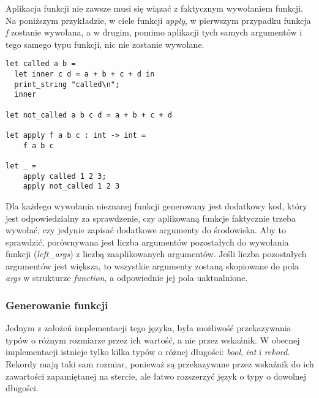 \documentclass[declaration,shortabstract]{iithesis}
\begin{document}
Aplikacja funkcji nie zawsze musi się wiązać z faktycznym wywołaniem funkcji.
Na poniższym przykładzie, w ciele funkcji \textit{apply},
w pierwszym przypadku funkcja \textit{f} zostanie wywołana, 
a w drugim, pomimo aplikacji tych samych argumentów i tego samego typu 
funkcji, nic nie zostanie wywołane.
\begin{lstlisting}[frame=single, caption={To czy funkcja zostanie wywołana,
nie jest wiadome w czasie kompilacj. OCaml.}]
let called a b = 
  let inner c d = a + b + c + d in 
  print_string "called\n";
  inner 

let not_called a b c d = a + b + c + d 

let apply f a b c : int -> int = 
    f a b c 

let _ = 
    apply called 1 2 3;
    apply not_called 1 2 3
\end{lstlisting}

Dla każdego wywołania nieznanej funkcji generowany jest dodatkowy \newline
kod, który jest odpowiedzialny za sprawdzenie, czy aplikowaną funkcje 
faktycznie trzeba wywołać, czy jedynie zapisać dodatkowe argumenty do 
środowiska. Aby to sprawdzić, porównywana jest liczba argumentów pozostałych do 
wywołania funkcji (\textit{left\_args}) z liczbą zaaplikowanych argumentów.
Jeśli liczba pozostałych argumentów jest większa, to wszystkie argumenty 
zostaną skopiowane do pola \textit{args} w strukturze \textit{function}, a 
odpowiednie jej pola uaktualnione.










\subsubsection{Generowanie funkcji}

Jednym z założeń implementacji tego języka, była możliwość przekazywania typów
o różnym rozmiarze przez ich wartość, a nie przez wskaźnik. W obecnej 
implementacji istnieje tylko kilka typów o różnej długości: \textit{bool},
\textit{int} i \textit{rekord}. Rekordy mają taki sam rozmiar, ponieważ są 
przekazywane przez wskaźnik do ich zawartości zapamiętanej na stercie, ale 
łatwo rozszerzyć język o typy o dowolnej długości. 
\end{document}
